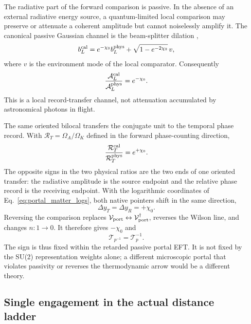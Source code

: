\documentclass[aps,prd,twocolumn,10pt,superscriptaddress,nofootinbib]{revtex4-2}
\begin{document}
The radiative part of the forward comparison is passive.  In the absence of
an external radiative energy source, a quantum-limited local comparison may
preserve or attenuate a coherent amplitude but cannot noiselessly amplify
it.  The canonical passive Gaussian channel is the beam-splitter dilation
\cite{HolevoWerner2001,Caves1982},
\begin{equation}
 b_L^{\rm cal}=e^{-\chi_0}b_L^{\rm phys}
 +\sqrt{1-e^{-2\chi_0}}\,v,
 \label{eq:portal_beamsplitter_dilation}
\end{equation}
where $v$ is the environment mode of the local comparator.  Consequently
\begin{equation}
 \frac{\mathcal A_L^{\rm cal}}{\mathcal A_L^{\rm phys}}
 =e^{-\chi_0}.
 \label{eq:portal_passive_radiative_sign}
\end{equation}
This is a local record-transfer channel, not attenuation accumulated by
astronomical photons in flight.

The same oriented bilocal transfers the conjugate unit to the temporal
phase record.  With $\mathcal R_T=\Omega_A/\Omega_K$ defined in the forward
phase-counting direction,
\begin{equation}
 \frac{\mathcal R_T^{\rm cal}}{\mathcal R_T^{\rm phys}}
 =e^{+\chi_0}.
 \label{eq:portal_temporal_sign}
\end{equation}
The opposite signs in the two physical ratios are the two ends of one
oriented transfer: the radiative amplitude is the source endpoint and the
relative phase record is the receiving endpoint.  With the logarithmic
coordinates of Eq.~\eqref{eq:portal_matter_logs}, both native pointers shift
in the same direction,
\begin{equation}
 \boxed{\Delta y_T=\Delta y_R=+\chi_0.}
 \label{eq:portal_signed_pointer_shifts}
\end{equation}
Reversing the comparison replaces
$\mathcal V_{\rm port}\leftrightarrow\mathcal V_{\rm port}^\dagger$,
reverses the Wilson line, and changes $n:1\to0$.  It therefore gives
$-\chi_0$ and
\begin{equation}
 \mathcal T_{p^{-1}}=\mathcal T_p^{-1}.
 \label{eq:portal_inverse_path}
\end{equation}
The sign is thus fixed within the retarded passive portal EFT.  It is not
fixed by the SU(2) representation weights alone; a different microscopic
portal that violates passivity or reverses the thermodynamic arrow would be
a different theory.

\subsection{Single engagement in the actual distance ladder}
\label{sec:single_engagement_complete}
\end{document}
